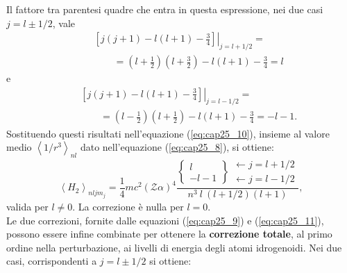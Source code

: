 \documentclass[a4paper,12pt,oneside]{book}
\begin{document}
Il fattore tra parentesi quadre che entra in questa espressione, nei due casi $j=l\pm1/2$, vale 
\begin{eqnarray} 
& &\left. \left[ j(j+1)-l(l+1)-\frac{3}{4}  \right]  \right|_{j=l+1/2} = \nonumber \\ 
& &\qquad = \left( l+\frac{1}{2} \right) \left( l+\frac{3}{2}\right)-l\left(l+1 \right) -\frac{3}{4}=l
\end{eqnarray}
e
\begin{eqnarray} 
& &\left. \left[ j(j+1)-l(l+1)-\frac{3}{4}  \right] \right|_{j=l-1/2} = \nonumber  \\ 
& &\qquad = \left( l-\frac{1}{2} \right) \left(l+\frac{1}{2} \right)-l\left( l+1 \right) -\frac{3}{4}=-l-1 .
\end{eqnarray}
Sostituendo questi risultati nell'equazione (\ref{eq:cap25_10}), insieme al valore medio $\left< 1/r^3 \right>_{nl}$ dato nell'equazione (\ref{eq:cap25_8}), si ottiene:
\begin{equation} \label{eq:cap25_11}
\left< H_2 \right>_{nljm_j}=\frac{1}{4}mc^2\left( \mathcal{Z}\alpha \right)^4 \frac{\begin{Bmatrix}
      l  \\ 
      -l-1 
    \end{Bmatrix}
    \begin{matrix}
    \leftarrow j=l+1/2 \\
    \leftarrow j=l-1/2
    \end{matrix} }{n^3 \ l \ \left(l+1/2 \right) \left( l+1 \right)} ,
\end{equation}
valida per $l\neq0$. La correzione è nulla per $l=0$. \\
Le due correzioni, fornite dalle equazioni (\ref{eq:cap25_9}) e (\ref{eq:cap25_11}), possono essere infine combinate per ottenere la \textbf{correzione totale}, al primo ordine nella perturbazione, ai livelli di energia degli atomi idrogenoidi. Nei due casi, corrispondenti a $j=l\pm1/2$ si ottiene:
\end{document}
